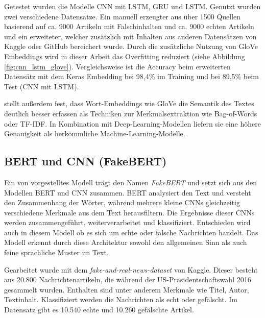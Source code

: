Getestet wurden die Modelle CNN mit LSTM, GRU und LSTM. Genutzt wurden zwei verschiedene Datensätze. Ein manuell erzeugter aus über 1500 Quellen basierend auf
ca. 9000 Artikeln mit Falschinhalten und ca. 9000 echten Artikeln und ein erweiteter, welcher zusätzlich mit Inhalten aus anderen Datensätzen von Kaggle oder
GitHub bereichert wurde.
Durch die zusätzliche Nutzung von GloVe Embeddings wird in dieser Arbeit das Overfitting reduziert (siehe Abbildung \ref{fig:cnn_lstm_glove}).
Vergleichsweise ist die Accuracy beim erweiterten Datensätz mit dem Keras Embedding bei 98,4\% im Training und bei 89,5\% beim Test (CNN mit LSTM).

\cite{Buddhadev2025} stellt außerdem fest, dass Wort-Embeddings wie GloVe die Semantik des Textes deutlich besser erfassen als Techniken zur Merkmalsextraktion 
wie Bag-of-Words oder TF-IDF. In Kombination mit Deep-Learning-Modellen liefern sie eine höhere Genauigkeit als herkömmliche Machine-Learning-Modelle.

\subsection{BERT und CNN (FakeBERT)}
\label{sec:fakebert}

Ein von \cite{Kaliyar:2021aa} vorgestelltes Modell trägt den Namen \textit{FakeBERT} und setzt sich aus den Modellen BERT und CNN zusammen.
BERT analysiert den Text und versteht den 
Zusammenhang der Wörter, während mehrere kleine CNNs gleichzeitig verschiedene Merkmale aus dem Text herausfiltern. Die Ergebnisse dieser 
CNNs werden zusammengeführt, weiterverarbeitet und klassifiziert. Entschieden wird auch in diesem Modell ob es sich um echte oder falsche 
Nachrichten handelt. Das Modell erkennt durch diese Architektur sowohl den allgemeinen Sinn als auch feine sprachliche Muster im Text.

Gearbeitet wurde mit dem \textit{fake-and-real-news-dataset} von Kaggle. Dieser besteht aus 20.800 Nachrichtenartikeln, die während der US-Präsidentschaftswahl 2016 gesammelt wurden. 
Enthalten sind unter anderem Merkmale wie Titel, Autor, Textinhalt. Klassifiziert werden die Nachrichten als echt oder gefälscht. 
Im Datensatz gibt es 10.540 echte und 10.260 gefälschte Artikel.

